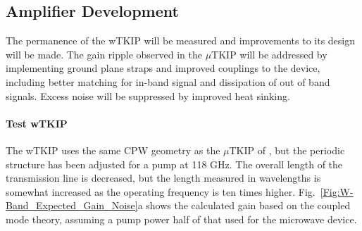 \subsection*{Amplifier Development}
The permanence of the wTKIP will be measured and improvements to its design will be made.  The gain ripple observed in the $\mu$TKIP will be addressed by implementing ground plane straps and improved couplings to the device, including better matching for in-band signal and dissipation of out of band signals.  Excess noise will be suppressed by improved heat sinking. 

\paragraph*{Test wTKIP}
The wTKIP uses the same CPW geometry as the $\mu$TKIP of \cite{Eom2012}, but the periodic structure has been adjusted for a pump at 118 GHz. The overall length of the transmission line is decreased, but the length measured in wavelengths is somewhat increased as the operating frequency is ten times higher. Fig.~\ref{Fig:W-Band_Expected_Gain_Noise}a shows the calculated gain based on the coupled mode theory, assuming a pump power half of that used for the microwave device.
